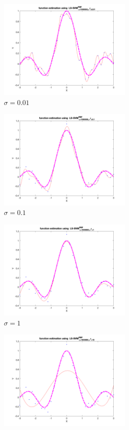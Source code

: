 \documentclass[a4paper, 11pt, one column]{article}
\begin{document}
\begin{figure}[H]
    \centering
        \begin{subfigure}{0.33\linewidth}
            \includegraphics[width=6.5cm]{images/sig_0.01_gamma_10^6png.png}
            \caption{$\sigma=0.01$}
        \end{subfigure}\hfil
        \begin{subfigure}{0.33\linewidth}
            \includegraphics[width=6.5cm]{images/sig_0.1_gamma_10^6.png}
            \caption{$\sigma=0.1$}
        \end{subfigure}\hfil
        \begin{subfigure}{0.33\linewidth}
            \includegraphics[width=6.5cm]{images/sig_1_gamma_10^6.png}
            \caption{$\sigma=1$}
        \end{subfigure}\hfil
        \begin{subfigure}{0.33\linewidth}
            \includegraphics[width=6.5cm]{images/sig_10_gamma_10^6.png}

\end{subfigure}
\end{figure}
\end{document}
